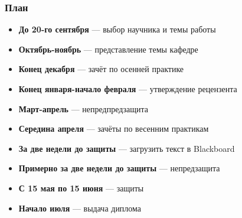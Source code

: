 \documentclass{../../slides-style}
\begin{document}
    \begin{frame}[plain]
        \titlepage
    \end{frame}

    \begin{frame}
        \frametitle{План}
        \begin{itemize}
            \item \textbf{До 20-го сентября} --- выбор научника и темы работы
            \item \textbf{Октябрь-ноябрь} --- представление темы кафедре
            \item \textbf{Конец декабря} --- зачёт по осенней практике
            \item \textbf{Конец января-начало февраля} --- утверждение рецензента
            \item \textbf{Март-апрель} --- непредпредзащита
            \item \textbf{Середина апреля} --- зачёты по весенним практикам
            \item \textbf{За две недели до защиты} --- загрузить текст в Blackboard
            \item \textbf{Примерно за две недели до защиты} --- непредзащита
            \item \textbf{С 15 мая по 15 июня} --- защиты
            \item \textbf{Начало июля} --- выдача диплома
        \end{itemize}
    \end{frame}
    
\end{document}

